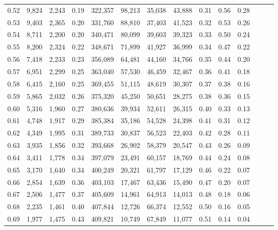 \begin{tabular}{rrrrrrrrrrrrrr}
0.52 &   9,824 &  2,243 &  0.19 &  322,357 &   98,213 &  35,038 &  43,888 &  0.31 &  0.56 &      0.28 \\
0.53 &   9,403 &  2,365 &  0.20 &  331,760 &   88,810 &  37,403 &  41,523 &  0.32 &  0.53 &      0.26 \\
0.54 &   8,711 &  2,200 &  0.20 &  340,471 &   80,099 &  39,603 &  39,323 &  0.33 &  0.50 &      0.24 \\
0.55 &   8,200 &  2,324 &  0.22 &  348,671 &   71,899 &  41,927 &  36,999 &  0.34 &  0.47 &      0.22 \\
0.56 &   7,418 &  2,233 &  0.23 &  356,089 &   64,481 &  44,160 &  34,766 &  0.35 &  0.44 &      0.20 \\
0.57 &   6,951 &  2,299 &  0.25 &  363,040 &   57,530 &  46,459 &  32,467 &  0.36 &  0.41 &      0.18 \\
0.58 &   6,415 &  2,160 &  0.25 &  369,455 &   51,115 &  48,619 &  30,307 &  0.37 &  0.38 &      0.16 \\
0.59 &   5,865 &  2,032 &  0.26 &  375,320 &   45,250 &  50,651 &  28,275 &  0.38 &  0.36 &      0.15 \\
0.60 &   5,316 &  1,960 &  0.27 &  380,636 &   39,934 &  52,611 &  26,315 &  0.40 &  0.33 &      0.13 \\
0.61 &   4,748 &  1,917 &  0.29 &  385,384 &   35,186 &  54,528 &  24,398 &  0.41 &  0.31 &      0.12 \\
0.62 &   4,349 &  1,995 &  0.31 &  389,733 &   30,837 &  56,523 &  22,403 &  0.42 &  0.28 &      0.11 \\
0.63 &   3,935 &  1,856 &  0.32 &  393,668 &   26,902 &  58,379 &  20,547 &  0.43 &  0.26 &      0.09 \\
0.64 &   3,411 &  1,778 &  0.34 &  397,079 &   23,491 &  60,157 &  18,769 &  0.44 &  0.24 &      0.08 \\
0.65 &   3,170 &  1,640 &  0.34 &  400,249 &   20,321 &  61,797 &  17,129 &  0.46 &  0.22 &      0.07 \\
0.66 &   2,854 &  1,639 &  0.36 &  403,103 &   17,467 &  63,436 &  15,490 &  0.47 &  0.20 &      0.07 \\
0.67 &   2,506 &  1,477 &  0.37 &  405,609 &   14,961 &  64,913 &  14,013 &  0.48 &  0.18 &      0.06 \\
0.68 &   2,235 &  1,461 &  0.40 &  407,844 &   12,726 &  66,374 &  12,552 &  0.50 &  0.16 &      0.05 \\
0.69 &   1,977 &  1,475 &  0.43 &  409,821 &   10,749 &  67,849 &  11,077 &  0.51 &  0.14 &      0.04 \\

\end{tabular}
